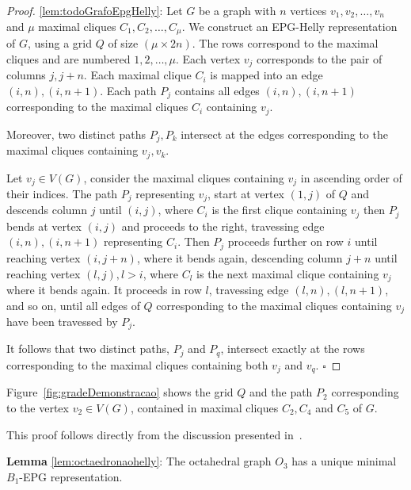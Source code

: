 \documentclass[runningheads]{llncs}
\begin{document}
  \begin{proof}  %
  \ref{lem:todoGrafoEpgHelly}:
  Let $G$ be a graph with $n$ vertices $v_1, v_2, \dots, v_n$ and $\mu$ maximal cliques $C_1, C_2, \dots , C_{\mu }$. We construct an EPG-Helly representation of $G$, using a grid $Q$ of size $(\mu \times 2n)$. The rows correspond to the maximal cliques and are numbered $1, 2, \dots , \mu$. Each vertex $v_j$ corresponds to the pair of columns $j, j+n$. Each maximal clique $C_i$ is mapped into an edge $(i,n), (i,n+1)$. Each path $P_j$ contains all edges $(i,n), (i,n+1)$ corresponding to the maximal cliques $C_i$ containing $v_j$.
  
  Moreover, two distinct paths $P_j,P_k$ intersect at the edges corresponding to the maximal cliques containing $v_j,v_k$.
  
  Let $v_j \in V(G)$, consider the maximal cliques containing $v_j$ in ascending order of their indices. The path $P_j$ representing $v_j$, start at vertex $(1,j)$ of $Q$ and descends column $j$ until $(i,j)$, where $C_i$ is the first clique containing $v_j$ then $P_j$ bends at vertex $(i,j)$ and proceeds to the right, travessing edge $(i,n), (i,n+1)$ representing $C_i$. Then $P_j$ proceeds further on row $i$ until reaching vertex $(i, j+n)$, where it bends again, descending column $j+n$ until reaching vertex $(l,j), l>i$, where $C_l$ is the next maximal clique containing $v_j$ where it bends again. It proceeds in row $l$, travessing edge $(l,n),(l,n+1)$, and so on, until all edges of $Q$ corresponding to the maximal cliques containing $v_j$ have been travessed by $P_j$.   
  
It follows that two distinct paths, $P_j$ and $P_q$, intersect exactly at the rows corresponding to the maximal cliques containing both $v_j$ and $v_q$.  
  $\square$ \end{proof}
 
 Figure~\ref{fig:gradeDemonstracao} shows the grid $Q$ and the path $P_2$ corresponding to the vertex $v_2 \in V(G)$, contained in maximal cliques $C_2, C_4$ and $C_5$ of $G$.
 
  
 

This proof follows directly from the discussion presented in~\cite{heldt2014}.  

\begin{lemma*}\textbf{Lemma} \ref{lem:octaedronaohelly}:
The octahedral graph $O_3$ has a unique minimal  $ B_1$-EPG representation.%
\end{lemma*}
\end{document}
